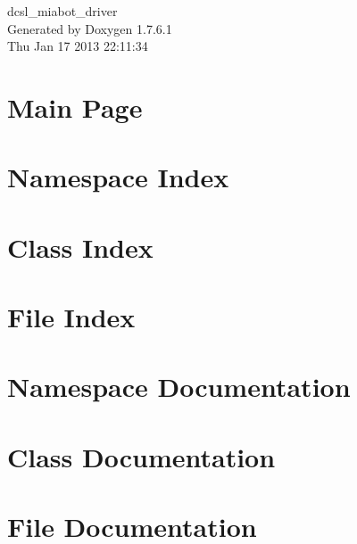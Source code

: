\documentclass[a4paper]{book}
\begin{document}
\begin{titlepage}
\vspace*{7cm}
\begin{center}
{\Large dcsl\-\_\-miabot\-\_\-driver }\\
\vspace*{1cm}
{\large \-Generated by Doxygen 1.7.6.1}\\
\vspace*{0.5cm}
{\small Thu Jan 17 2013 22:11:34}\\
\end{center}
\end{titlepage}
\clearemptydoublepage
{}
\tableofcontents
\clearemptydoublepage
{}
\chapter{\-Main \-Page}
\label{index}
\chapter{\-Namespace \-Index}

\chapter{\-Class \-Index}

\chapter{\-File \-Index}

\chapter{\-Namespace \-Documentation}


\chapter{\-Class \-Documentation}


\chapter{\-File \-Documentation}




\printindex
\end{document}
